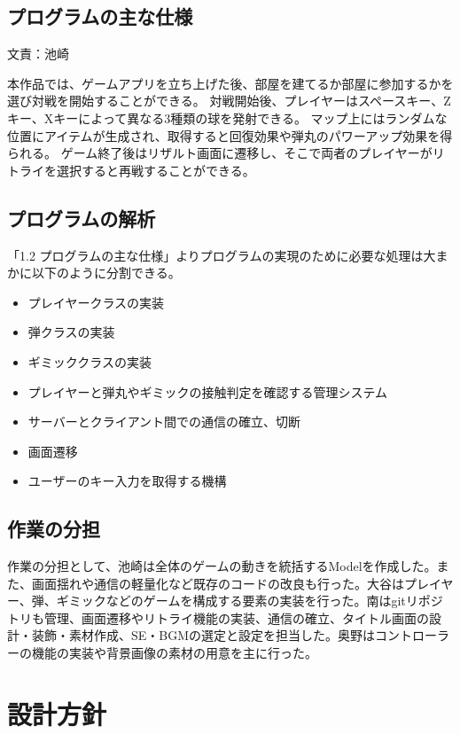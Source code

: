 \documentclass[11pt,a4j]{jarticle}
\begin{document}
\subsection{プログラムの主な仕様}
\begin{flushright}
  文責：池崎
\end{flushright}
本作品では、ゲームアプリを立ち上げた後、部屋を建てるか部屋に参加するかを選び対戦を開始することができる。
対戦開始後、プレイヤーはスペースキー、Zキー、Xキーによって異なる3種類の球を発射できる。
マップ上にはランダムな位置にアイテムが生成され、取得すると回復効果や弾丸のパワーアップ効果を得られる。
ゲーム終了後はリザルト画面に遷移し、そこで両者のプレイヤーがリトライを選択すると再戦することができる。

\subsection{プログラムの解析}
「1.2 プログラムの主な仕様」よりプログラムの実現のために必要な処理は大まかに以下のように分割できる。
\begin{itemize}
  \item プレイヤークラスの実装
  \item 弾クラスの実装
  \item ギミッククラスの実装
  \item プレイヤーと弾丸やギミックの接触判定を確認する管理システム
  \item サーバーとクライアント間での通信の確立、切断
  \item 画面遷移
  \item ユーザーのキー入力を取得する機構
  
\end{itemize}

\subsection{作業の分担}
作業の分担として、池崎は全体のゲームの動きを統括するModelを作成した。また、画面揺れや通信の軽量化など既存のコードの改良も行った。大谷はプレイヤー、弾、ギミックなどのゲームを構成する要素の実装を行った。南はgitリポジトリも管理、画面遷移やリトライ機能の実装、通信の確立、タイトル画面の設計・装飾・素材作成、SE・BGMの選定と設定を担当した。奥野はコントローラーの機能の実装や背景画像の素材の用意を主に行った。\\

\section{設計方針}
\end{document}
